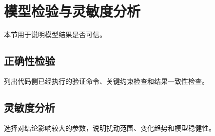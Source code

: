 \section{模型检验与灵敏度分析}
\label{sec:validation}

本节用于说明模型结果是否可信。

\subsection{正确性检验}

列出代码侧已经执行的验证命令、关键约束检查和结果一致性检查。

\subsection{灵敏度分析}

选择对结论影响较大的参数，说明扰动范围、变化趋势和模型稳健性。

